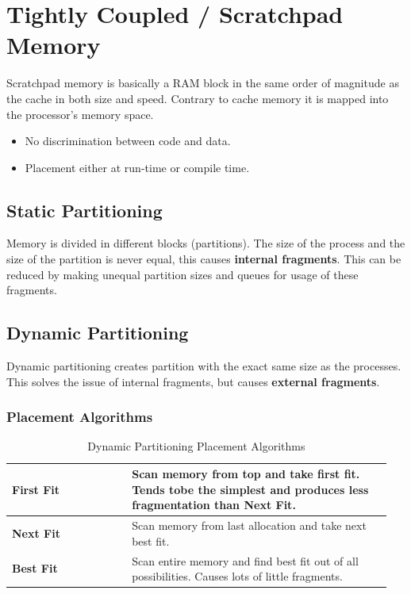 \section{Tightly Coupled / Scratchpad Memory }
	Scratchpad memory is basically a RAM block in the same order of magnitude as the cache in both size and speed. Contrary to cache memory it is mapped into the processor's memory space.
	
	\begin{itemize}
	  \item No discrimination between code and data.
	  \item Placement either at run-time or compile time.
	\end{itemize}
	
	\subsection{Static Partitioning }
		Memory is divided in different blocks (partitions). The size of the process and the size of the partition is never equal, this causes \textbf{internal fragments}. This can be reduced by making unequal partition sizes and queues for usage of these fragments.
	
	\subsection{Dynamic Partitioning }
		Dynamic partitioning creates partition with the exact same size as the processes. This solves the issue of internal fragments, but causes \textbf{external fragments}.
		
		\subsubsection{Placement Algorithms}
			\begin{table}[H]
				\centering
				\begin{tabular}{|p{0.3\linewidth}|p{0.65\linewidth}|}
					\hline
					\textbf{First Fit}
						& Scan memory from top and take first fit. Tends tobe the simplest and produces less fragmentation than \textbf{Next Fit}.\\
					\hline
					\textbf{Next Fit}
						& Scan memory from last allocation and take next best fit.\\
					\hline
					\textbf{Best Fit}
						& Scan entire memory and find best fit out of all possibilities. Causes lots of little fragments.\\
					\hline	
				\end{tabular}
				\caption{Dynamic Partitioning Placement Algorithms}
			\end{table}		
			
